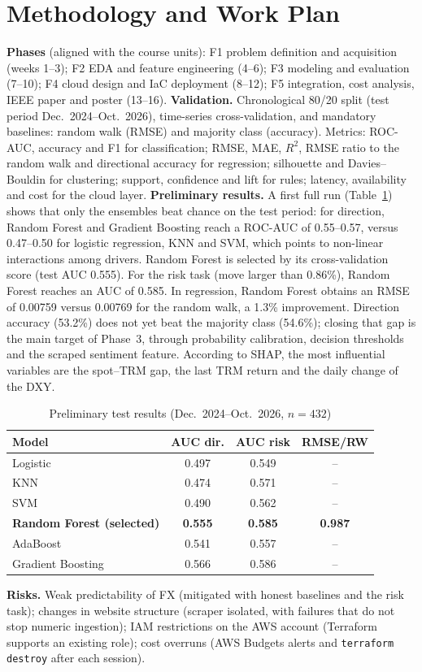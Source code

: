 \documentclass[conference]{IEEEtran}
\begin{document}
\section{Methodology and Work Plan}
\textbf{Phases} (aligned with the course units): F1 problem definition and acquisition (weeks 1--3); F2 EDA and feature engineering (4--6); F3 modeling and evaluation (7--10); F4 cloud design and IaC deployment (8--12); F5 integration, cost analysis, IEEE paper and poster (13--16).
\textbf{Validation.} Chronological 80/20 split (test period Dec.~2024--Oct.~2026), time-series cross-validation, and mandatory baselines: random walk (RMSE) and majority class (accuracy). Metrics: ROC-AUC, accuracy and F1 for classification; RMSE, MAE, $R^2$, RMSE ratio to the random walk and directional accuracy for regression; silhouette and Davies--Bouldin for clustering; support, confidence and lift for rules; latency, availability and cost for the cloud layer.
\textbf{Preliminary results.} A first full run (Table~\ref{tab:prelim}) shows that only the ensembles beat chance on the test period: for direction, Random Forest and Gradient Boosting reach a ROC-AUC of 0.55--0.57, versus 0.47--0.50 for logistic regression, KNN and SVM, which points to non-linear interactions among drivers. Random Forest is selected by its cross-validation score (test AUC 0.555). For the risk task (move larger than 0.86\%), Random Forest reaches an AUC of 0.585. In regression, Random Forest obtains an RMSE of 0.00759 versus 0.00769 for the random walk, a 1.3\% improvement. Direction accuracy (53.2\%) does not yet beat the majority class (54.6\%); closing that gap is the main target of Phase~3, through probability calibration, decision thresholds and the scraped sentiment feature. According to SHAP, the most influential variables are the spot--TRM gap, the last TRM return and the daily change of the DXY.

\begin{table}[t]
\caption{Preliminary test results (Dec.~2024--Oct.~2026, $n=432$)}
\label{tab:prelim}
\centering
\begin{tabular}{@{}lccc@{}}
\toprule
Model & AUC dir. & AUC risk & RMSE/RW \\
\midrule
Logistic & 0.497 & 0.549 & -- \\
KNN & 0.474 & 0.571 & -- \\
SVM & 0.490 & 0.562 & -- \\
\textbf{Random Forest (selected)} & \textbf{0.555} & \textbf{0.585} & \textbf{0.987} \\
AdaBoost & 0.541 & 0.557 & -- \\
Gradient Boosting & 0.566 & 0.586 & -- \\
\bottomrule
\end{tabular}
\end{table}
\textbf{Risks.} Weak predictability of FX (mitigated with honest baselines and the risk task); changes in website structure (scraper isolated, with failures that do not stop numeric ingestion); IAM restrictions on the AWS account (Terraform supports an existing role); cost overruns (AWS Budgets alerts and \texttt{terraform destroy} after each session).
\end{document}
